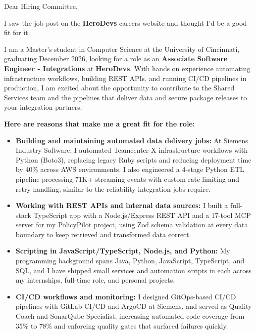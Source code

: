 \documentclass[11pt]{letter}
\date{}
\begin{document}
\begin{letter}{}

\opening{Dear Hiring Committee,}

I saw the job post on the \textbf{HeroDevs} careers website and thought I'd be a good fit for it.

I am a Master's student in Computer Science at the University of Cincinnati, graduating December 2026, looking for a role as an \textbf{Associate Software Engineer - Integrations} at \textbf{HeroDevs}. With hands on experience automating infrastructure workflows, building REST APIs, and running CI/CD pipelines in production, I am excited about the opportunity to contribute to the Shared Services team and the pipelines that deliver data and secure package releases to your integration partners.

\textbf{Here are reasons that make me a great fit for the role:}

\begin{itemize}[leftmargin=*, itemsep=0.45em]
    \item \textbf{Building and maintaining automated data delivery jobs:} At Siemens Industry Software, I automated Teamcenter X infrastructure workflows with Python (Boto3), replacing legacy Ruby scripts and reducing deployment time by 40\% across AWS environments. I also engineered a 4-stage Python ETL pipeline processing 71K+ streaming events with custom rate limiting and retry handling, similar to the reliability integration jobs require.

    \item \textbf{Working with REST APIs and internal data sources:} I built a full-stack TypeScript app with a Node.js/Express REST API and a 17-tool MCP server for my PolicyPilot project, using Zod schema validation at every data boundary to keep retrieved and transformed data correct.

    \item \textbf{Scripting in JavaScript/TypeScript, Node.js, and Python:} My programming background spans Java, Python, JavaScript, TypeScript, and SQL, and I have shipped small services and automation scripts in each across my internships, full-time role, and personal projects.

    \item \textbf{CI/CD workflows and monitoring:} I designed GitOps-based CI/CD pipelines with GitLab CI/CD and ArgoCD at Siemens, and served as Quality Coach and SonarQube Specialist, increasing automated code coverage from 35\% to 78\% and enforcing quality gates that surfaced failures quickly.


\end{itemize}
\end{letter}
\end{document}
